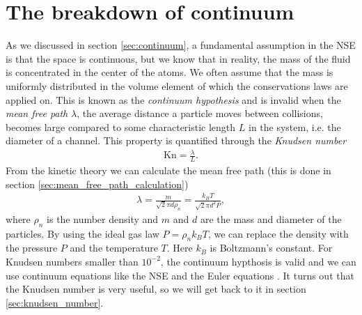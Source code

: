 \section{The breakdown of continuum}
\label{sec:continuum_breakdown}
As we discussed in section \ref{sec:continuum}, a fundamental assumption in the NSE is that the space is continuous, but we know that in reality, the mass of the fluid is concentrated in the center of the atoms. We often assume that the mass is uniformly distributed in the volume element of which the conservations laws are applied on. This is known as the \textit{continuum hypothesis} and is invalid when the \textit{mean free path} $\lambda$, the average distance a particle moves between collisions, becomes large compared to some characteristic length $L$ in the system, i.e. the diameter of a channel\cite{karniadakis2005microflows}. This property is quantified through the \textit{Knudsen number}
\begin{align}
	\text{Kn} = \frac{\lambda}{L}.
\end{align}
From the kinetic theory we can calculate the mean free path (this is done in section \ref{sec:mean_free_path_calculation})
\begin{align}
	\lambda = \frac{m}{\sqrt 2 \pi d \rho_n} = \frac{k_B T}{\sqrt 2 \pi d^2 P},
\end{align}
where $\rho_n$ is the number density and $m$ and $d$ are the mass and diameter of the particles. By using the ideal gas law $P = \rho_n k_BT$, we can replace the density with the pressure $P$ and the temperature $T$. Here $k_B$ is Boltzmann's constant. For Knudsen numbers smaller than $10^{-2}$, the continuum hypthosis is valid and we can use continuum equations like the NSE and the Euler equations \cite{karniadakis2005microflows}. It turns out that the Knudsen number is very useful, so we will get back to it in section \ref{sec:knudsen_number}.


